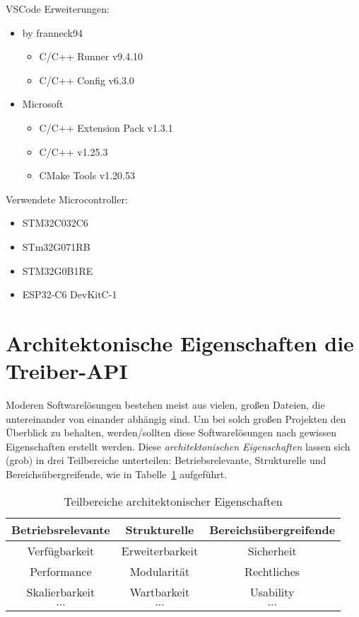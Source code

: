 VSCode Erweiterungen:
\begin{itemize}
	\item by franneck94
	\begin{itemize}
		\item C/C++ Runner v9.4.10
		\item C/C++ Config v6.3.0
	\end{itemize}
	\item Microsoft
	\begin{itemize}
		\item C/C++ Extension Pack v1.3.1
		\item C/C++ v1.25.3
		\item CMake Tools v1.20.53
	\end{itemize}
\end{itemize}

Verwendete Microcontroller:
\begin{itemize}
	\item STM32C032C6
	\item STm32G071RB
	\item STM32G0B1RE
	\item ESP32-C6 DevKitC-1
\end{itemize}


\section{Architektonische Eigenschaften die Treiber-API}
Moderen Softwarelösungen bestehen meist aus vielen, großen Dateien, die untereinander von einander abhängig sind.
Um bei solch großen Projekten den Überblick zu behalten, werden/sollten diese Softwarelösungen nach gewissen Eigenschaften erstellt werden.
Diese \emph{architektonischen Eigenschaften} lassen sich (grob) in drei Teilbereiche unterteilen: Betriebsrelevante, Strukturelle und Bereichsübergreifende, wie in Tabelle~\ref{tab:architektonische_eigenschaften} aufgeführt. %

\begin{table}[H]
	\begin{center}
		\begin{tabular}{ c | c | c }
			\textbf{Betriebsrelevante} & \textbf{Strukturelle} & \textbf{Bereichsübergreifende}\\
			\hline
			Verfügbarkeit & Erweiterbarkeit & Sicherheit\\
			Performance & Modularität & Rechtliches\\
			Skalierbarkeit & Wartbarkeit & Usability\\
			$\cdots$ & $\cdots$ & $\cdots$\\
		\end{tabular}
		\caption{Teilbereiche architektonischer Eigenschaften}
	    \label{tab:architektonische_eigenschaften}
	\end{center}
\end{table}

